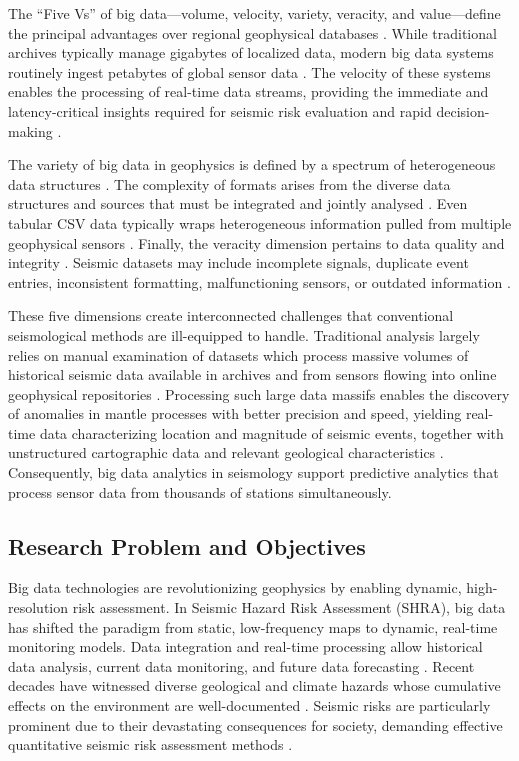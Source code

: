 \documentclass[data,article,accept,pdftex,moreauthors]{Definitions/mdpi}
\begin{document}
The ``Five Vs'' of big data---volume, velocity, variety, veracity, and value---define the principal advantages over regional geophysical databases \cite{Laney2001,Kitchin2014,Hashem2015}. While traditional archives typically manage gigabytes of localized data, modern big data systems routinely ingest petabytes of global sensor data \cite{arrowsmith2022big}. The velocity of these systems enables the processing of real-time data streams, providing the immediate and latency-critical insights required for seismic risk evaluation and rapid decision-making \cite{gandomi2015beyond,hashem2015rise,allen2009earthquake}.

The variety of big data in geophysics is defined by a spectrum of heterogeneous data structures \cite{MA201547}. The complexity of formats arises from the diverse data structures and sources that must be integrated and jointly analysed \cite{chen2014big}. Even tabular CSV data typically wraps heterogeneous information pulled from multiple geophysical sensors \cite{zhao2024artificial,Stocks2019}. Finally, the veracity dimension pertains to data quality and integrity \cite{vance2024big,Lietal2016}. Seismic datasets may include incomplete signals, duplicate event entries, inconsistent formatting, malfunctioning sensors, or outdated information \cite{mousavi2019cred}.

These five dimensions create interconnected challenges that conventional seismological methods are ill-equipped to handle. Traditional analysis largely relies on manual examination of datasets which process massive volumes of historical seismic data available in archives and from sensors flowing into online geophysical repositories \cite{Kong2019,Sopher,lemenkova2023computer}. Processing such large data massifs enables the discovery of anomalies in mantle processes with better precision and speed, yielding real-time data characterizing location and magnitude of seismic events, together with unstructured cartographic data and relevant geological characteristics \cite{baumann2016big,ZhuBeroza2019}. Consequently, big data analytics in seismology support predictive analytics that process sensor data from thousands of stations simultaneously.

\subsection{Research Problem and Objectives}

Big data technologies are revolutionizing geophysics by enabling dynamic, high-resolution risk assessment. In Seismic Hazard Risk Assessment (SHRA), big data has shifted the paradigm from static, low-frequency maps to dynamic, real-time monitoring models. Data integration and real-time processing allow historical data analysis, current data monitoring, and future data forecasting \cite{Sen2009}. Recent decades have witnessed diverse geological and climate hazards whose cumulative effects on the environment are well-documented \cite{Liggins2013}. Seismic risks are particularly prominent due to their devastating consequences for society, demanding effective quantitative seismic risk assessment \linebreak methods \cite{Dowrick2009,Liu2024}.
\end{document}

